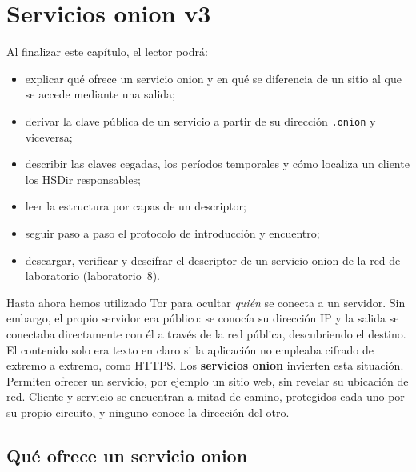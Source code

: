 \chapter{Servicios onion v3}\label{cap:14-onion-services}

\begin{obiettivi}
Al finalizar este capítulo, el lector podrá:
\begin{itemize}[nosep]
  \item explicar qué ofrece un servicio onion y en qué se diferencia de un sitio al que se accede mediante una salida;
  \item derivar la clave pública de un servicio a partir de su dirección \texttt{.onion} y viceversa;
  \item describir las claves cegadas, los períodos temporales y cómo localiza un cliente los HSDir responsables;
  \item leer la estructura por capas de un descriptor;
  \item seguir paso a paso el protocolo de introducción y encuentro;
  \item descargar, verificar y descifrar el descriptor de un servicio onion de la red de laboratorio (laboratorio~8).
\end{itemize}
\end{obiettivi}

Hasta ahora hemos utilizado Tor para ocultar \emph{quién} se conecta a un servidor. Sin embargo, el propio servidor era público: se conocía su dirección IP y la salida se conectaba directamente con él a través de la red pública, descubriendo el destino. El contenido solo era texto en claro si la aplicación no empleaba cifrado de extremo a extremo, como HTTPS. Los \textbf{servicios onion} invierten esta situación. Permiten ofrecer un servicio, por ejemplo un sitio web, sin revelar su ubicación de red. Cliente y servicio se encuentran a mitad de camino, protegidos cada uno por su propio circuito, y ninguno conoce la dirección del otro.

\section{Qué ofrece un servicio onion}\label{sec:os-proprieta}


